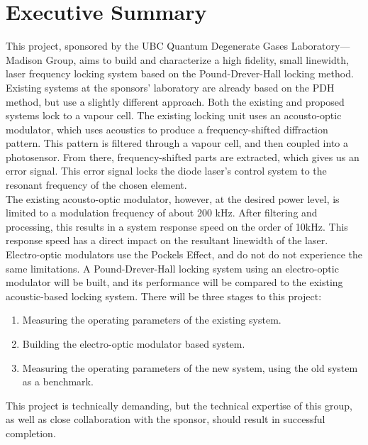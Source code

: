 \newpage
\section*{Executive Summary}

This project, sponsored by the UBC Quantum Degenerate Gases
Laboratory---Madison Group, aims to build and characterize a high
fidelity, small linewidth, laser frequency locking system based on the
Pound-Drever-Hall locking method. \\

Existing systems at the sponsors' laboratory are already based
on the PDH method, but use a slightly different approach.  Both the
existing and proposed systems lock to a vapour cell.  The
existing locking unit uses an acousto-optic modulator, which uses acoustics
to produce a frequency-shifted diffraction pattern.  This pattern is filtered
through a vapour cell, and then coupled into a photosensor.  From there,
frequency-shifted parts are extracted, which gives us an error signal.  This
error signal locks the diode laser's control system to the resonant frequency
of the chosen element. \\

The existing acousto-optic modulator, however, at the desired power level, is limited to a modulation frequency of about 200 kHz. After filtering and processing, this results in a system response speed  on the order of 10kHz. This response speed has a direct impact on the resultant linewidth of the laser. \cite{madison14}  \\

Electro-optic modulators use the Pockels Effect, and do not do not experience the same limitations. A Pound-Drever-Hall locking system using an electro-optic modulator will
be built, and its performance will be compared to the existing acoustic-based
locking system. There will be three stages to this project:
\begin{enumerate}
 \item Measuring the operating parameters of the existing system.
 \item Building the electro-optic modulator based system.
 \item Measuring the operating parameters of the new system, using the
 old system as a benchmark.
\end{enumerate}
This project is technically demanding, but the technical expertise of this
group, as well as close collaboration with the sponsor, should result in
successful completion.

